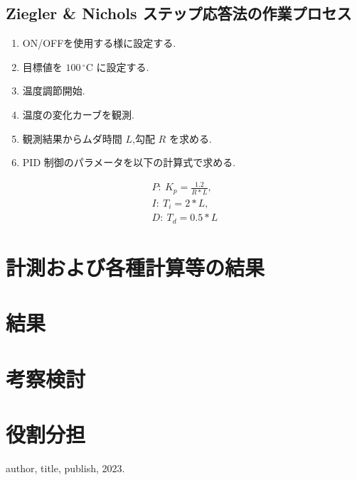 \documentclass[a4j, titlepage]{jarticle}
\begin{document}
\subsection{Ziegler \& Nichols ステップ応答法の作業プロセス}
\begin{enumerate}
    \item ON/OFFを使用する様に設定する.
    \item 目標値を $100\, ^{\circ}\mathrm{C}$ に設定する.
    \item 温度調節開始.
    \item 温度の変化カーブを観測.
    \item 観測結果からムダ時間 $L$,勾配 $R$ を求める.
    \item PID 制御のパラメータを以下の計算式で求める.
\end{enumerate}
\begin{align*}
    P:\ K_p = \frac{1.2}{R * L}, \\
    I:\ T_i = 2 * L, \\
    D:\ T_d = 0.5 * L
\end{align*}

\section{計測および各種計算等の結果}
\section{結果}
\section{考察検討}
\section{役割分担}

\begin{thebibliography}{9}
   author, title, publish, 2023.
\end{thebibliography}
\end{document}
